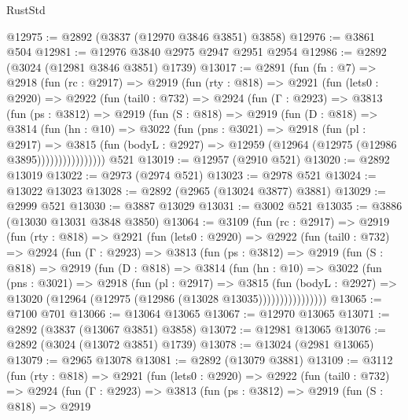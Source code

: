 \begin{lexlean}{RustStd}
\begin{coremodule}
@12975 := @2892 (@3837 (@12970 @3846 @3851) @3858)
@12976 := @3861 @504
@12981 := @12976 @3840 @2975 @2947 @2951 @2954
@12986 := @2892 (@3024 (@12981 @3846 @3851) @1739)
@13017 := @2891
    (fun (fn : @7) =>
    @2918
      (fun (rc : @2917) =>
      @2919
        (fun (rty : @818) =>
        @2921
          (fun (lets0 : @2920) =>
          @2922
            (fun (tail0 : @732) =>
            @2924
              (fun (Γ : @2923) =>
              @3813
                (fun (ps : @3812) =>
                @2919
                  (fun (S : @818) =>
                  @2919
                    (fun (D : @818) =>
                    @3814
                      (fun (hn : @10) =>
                      @3022
                        (fun (pns : @3021) =>
                        @2918
                          (fun (pl : @2917) =>
                          @3815
                            (fun (bodyL : @2927) =>
                            @12959 (@12964 (@12975 (@12986 @3895))))))))))))))))
    @521
@13019 := @12957 (@2910 @521)
@13020 := @2892 @13019
@13022 := @2973 (@2974 @521)
@13023 := @2978 @521
@13024 := @13022 @13023
@13028 := @2892 (@2965 (@13024 @3877) @3881)
@13029 := @2999 @521
@13030 := @3887 @13029
@13031 := @3002 @521
@13035 := @3886 (@13030 @13031 @3848 @3850)
@13064 := @3109
    (fun (rc : @2917) =>
    @2919
      (fun (rty : @818) =>
      @2921
        (fun (lets0 : @2920) =>
        @2922
          (fun (tail0 : @732) =>
          @2924
            (fun (Γ : @2923) =>
            @3813
              (fun (ps : @3812) =>
              @2919
                (fun (S : @818) =>
                @2919
                  (fun (D : @818) =>
                  @3814
                    (fun (hn : @10) =>
                    @3022
                      (fun (pns : @3021) =>
                      @2918
                        (fun (pl : @2917) =>
                        @3815
                          (fun (bodyL : @2927) =>
                          @13020 (@12964 (@12975 (@12986 (@13028 @13035))))))))))))))))
@13065 := @7100 @701
@13066 := @13064 @13065
@13067 := @12970 @13065
@13071 := @2892 (@3837 (@13067 @3851) @3858)
@13072 := @12981 @13065
@13076 := @2892 (@3024 (@13072 @3851) @1739)
@13078 := @13024 (@2981 @13065)
@13079 := @2965 @13078
@13081 := @2892 (@13079 @3881)
@13109 := @3112
    (fun (rty : @818) =>
    @2921
      (fun (lets0 : @2920) =>
      @2922
        (fun (tail0 : @732) =>
        @2924
          (fun (Γ : @2923) =>
          @3813
            (fun (ps : @3812) =>
            @2919
              (fun (S : @818) =>
              @2919

\end{coremodule}
\end{lexlean}
